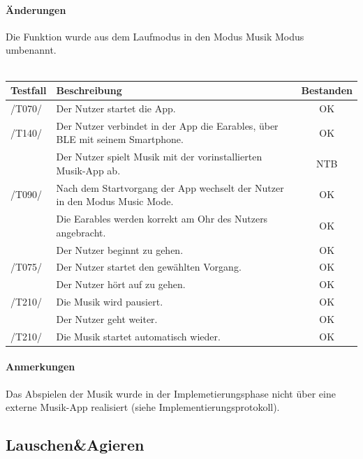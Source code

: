 \documentclass[a4paper,12pt]{article}
\newcommand{\testok}[0]{
	\cellcolor{green!25} OK
}
\newcommand{\testntb}[0]{NTB}
\begin{document}
\paragraph{Änderungen}
Die Funktion wurde aus dem Laufmodus in den Modus \glqq Musik Modus\grqq{} umbenannt.
\\
\\
\begin{tabular}{ |p{1.5cm} | p{12cm} | c| }
	\hline
	\textbf{Testfall} & \textbf{Beschreibung} & \textbf{Bestanden}\\
	\hline
	/T070/ & Der Nutzer startet die App. & \testok \\
	\hline
	/T140/ & Der Nutzer verbindet in der App die Earables, über BLE mit seinem Smartphone. & \testok \\
	\hline
	& Der Nutzer spielt Musik mit der vorinstallierten Musik-App ab. & \testntb \\
	\hline
	/T090/ & Nach dem Startvorgang der App wechselt der Nutzer in den Modus \glqq Music Mode\grqq . & \testok \\
	\hline
	& Die Earables werden korrekt am Ohr des Nutzers angebracht. & \testok \\
	\hline
	& Der Nutzer beginnt zu gehen. & \testok  \\
	\hline
	/T075/ & Der Nutzer startet den gewählten Vorgang. & \testok  \\
	\hline
	& Der Nutzer hört auf zu gehen. & \testok  \\
	\hline
	/T210/ & Die Musik wird pausiert. & \testok  \\
	\hline
	& Der Nutzer geht weiter. & \testok  \\
	\hline
	/T210/ & Die Musik startet automatisch wieder. & \testok  \\
	\hline
\end{tabular}
\paragraph{Anmerkungen}
Das Abspielen der Musik wurde in der Implemetierungsphase nicht über eine externe Musik-App realisiert (siehe Implementierungsprotokoll). 

\subsection{Lauschen\&Agieren}
\end{document}
